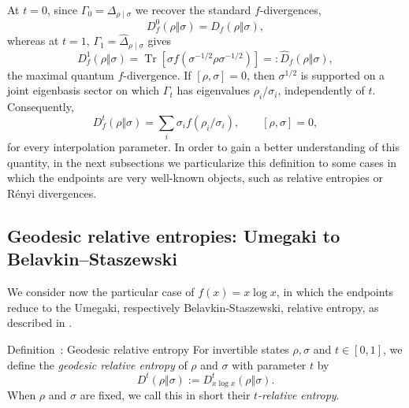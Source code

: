 \documentclass[11pt]{article}
\theoremstyle{remark}
\newcommand{\1}{\mathbbm{1}}
\begin{document}
At $t=0$, since $\Gamma_0=\Delta_{\rho\mid\sigma}$ we recover the standard $f$-divergences,
\begin{equation}
 D_f^0(\rho\Vert\sigma)=D_f(\rho\Vert\sigma),
 \label{rw:eq:standard-endpoint}
\end{equation}
whereas at $t=1$, $\Gamma_1=\widehat\Delta_{\rho\mid\sigma}$ gives
\begin{equation}
 D_f^1(\rho\Vert\sigma)
 =\operatorname{Tr}\!\left[
 \sigma f(\sigma^{-1/2}\rho\sigma^{-1/2})\right]
 =:\widehat D_f(\rho\Vert\sigma),
 \label{rw:eq:maximal-endpoint}
\end{equation}
the maximal quantum $f$-divergence.  If $[\rho,\sigma]=0$, then
$\sigma^{1/2}$ is supported on a joint eigenbasis sector on which
$\Gamma_t$ has eigenvalues $\rho_i/\sigma_i$, independently of
$t$.  Consequently,
\begin{equation}
 D_f^t(\rho\Vert\sigma)
 =\sum_i\sigma_i f(\rho_i/\sigma_i),
 \qquad [\rho,\sigma]=0,
 \label{rw:eq:classical-collapse}
\end{equation}
for every interpolation parameter. In order to gain a better understanding of this quantity, in the next subsections we particularize this definition to some cases in which the endpoints are very well-known objects, such as relative entropies or Rényi divergences.





\subsection{Geodesic relative entropies: Umegaki to Belavkin--Staszewski}
\label{rw:subsec:relative-special-case}
 We consider now the particular case of $f(x)=x \log x$, in which the endpoints reduce to the Umegaki, respectively Belavkin-Staszewski, relative entropy, as described in .

\begin{mainobject}{Definition~\thedefinition: Geodesic
relative entropy}
For invertible states $\rho,\sigma$ and $t\in[0,1]$, we define the \emph{geodesic relative entropy} of $\rho$ and $\sigma$ with parameter $t$ by
\begin{equation}
 D^t(\rho\Vert\sigma):=D_{x\log x}^t(\rho\Vert\sigma).
 \label{rw:eq:Dt-and-Kt}
\end{equation}
When $\rho$ and $\sigma$ are fixed, we call this in short their \textit{$t$-relative entropy}.
\end{mainobject}
\end{document}
